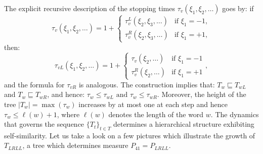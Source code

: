 \documentclass[10pt]{amsart}
\theoremstyle{definition}
\numberwithin{equation}{section}
\begin{document}





The explicit recursive description of the stopping times $\tau_{v}(\xi_1,\xi_2,\dots)$ goes by: if \[
  \tau_v(\xi_1,\xi_2,\dots) = 1 +
  \begin{cases}
    \tau^L_{v}(\xi_2,\xi_3,\dots) & \text{if } \xi_1 = -1,\\[4pt]
    \tau^R_{v}(\xi_2,\xi_3,\dots) & \text{if } \xi_1 = +1,
  \end{cases}
\]
then: 
\begin{equation}\label{stop}  \tau_{vL}(\xi_1,\xi_2,\dots)=1 +
    \begin{cases}
     \tau_v(\xi_2,\dots)&\text{if } \xi_1= -1
       \\
       \tau_{v}^R(\xi_2,\dots)&\text{if } \xi_1 = +1
     
  \end{cases},
\end{equation}
and the  formula for $\tau_{vR}$ is analogous. The construction implies that: $T_w \sqsubseteq T_{wL}$ and  $T_w \sqsubseteq T_{wR}$, and  hence: $\tau_{w}\leq\tau_{wL}\mbox{ and }\tau_{w}\leq\tau_{wR}$.
 Moreover, the height of the tree $|T_w|=\max(\tau_w)$ increases by at most one at each step and hence $\tau_w\leq \ell(w)+1$, where $\ell(w)$ denotes the length of the word $w$.  The dynamics that governs the sequence $\{T_t\}_{t\in T}$ determines  a hierarchical structure exhibiting self-similarity. Let us take a look on a few pictures which illustrate  the growth of $T_{LRLL}$, a tree which determines measure $P_{41}=P_{LRLL}$.
\end{document}
